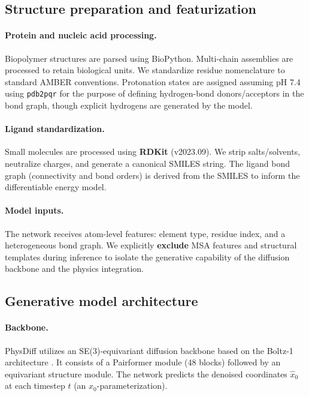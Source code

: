\documentclass[twocolumn,10pt]{article}
\newcommand{\modelname}{PhysDiff}
\begin{document}
\subsection{Structure preparation and featurization}

\paragraph{Protein and nucleic acid processing.}
Biopolymer structures are parsed using BioPython. Multi-chain assemblies are processed to retain biological units. We standardize residue nomenclature to standard AMBER conventions. Protonation states are assigned assuming pH 7.4 using \texttt{pdb2pqr} for the purpose of defining hydrogen-bond donors/acceptors in the bond graph, though explicit hydrogens are generated by the model.

\paragraph{Ligand standardization.}
Small molecules are processed using \textbf{RDKit} (v2023.09). We strip salts/solvents, neutralize charges, and generate a canonical SMILES string. The ligand bond graph (connectivity and bond orders) is derived from the SMILES to inform the differentiable energy model. 

\paragraph{Model inputs.}
The network receives atom-level features: element type, residue index, and a heterogeneous bond graph. We explicitly \textbf{exclude} MSA features and structural templates during inference to isolate the generative capability of the diffusion backbone and the physics integration.

\subsection{Generative model architecture}

\paragraph{Backbone.}
\modelname{} utilizes an SE(3)-equivariant diffusion backbone based on the Boltz-1 architecture \cite{wohlwend2024boltz}. It consists of a Pairformer module (48 blocks) followed by an equivariant structure module. The network predicts the denoised coordinates $\hat{x}_0$ at each timestep $t$ (an $x_0$-parameterization).
\end{document}
